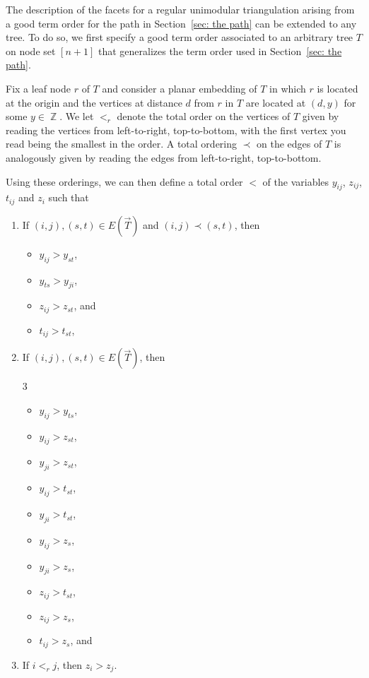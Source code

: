 \documentclass[11pt]{article}
\theoremstyle{definition}
\numberwithin{equation}{section}
\DeclareMathOperator{\ZZ}{\mathbb{Z}}
\begin{document}
The description of the facets for a regular unimodular triangulation arising from a good term order for the path in Section~\ref{sec: the path} can be extended to any tree.  
To do so, we first specify a good term order associated to an arbitrary tree $T$ on node set $[n+1]$ that generalizes the term order used in Section~\ref{sec: the path}.  

Fix a leaf node $r$ of $T$ and consider a planar embedding of $T$ in which $r$ is located at the origin and the vertices at distance $d$ from $r$ in $T$ are located at $(d, y)$ for some $y\in \ZZ$. 
We let $<_r$ denote the total order on the vertices of $T$ given by reading the vertices from left-to-right, top-to-bottom, with the first vertex you read being the smallest in the order. 
A total ordering $\prec$ on the edges of $T$ is analogously given by reading the edges from left-to-right, top-to-bottom. 

Using these orderings, we can then define a total order $<$ of the variables $y_{ij}$, $z_{ij}$, $t_{ij}$ and $z_i$ such that
\begin{enumerate}
    \item If $(i,j),(s,t)\in E(\overrightarrow{T})$ and $(i,j)\prec (s,t)$, then
    \begin{itemize}
        \item $y_{ij} > y_{st}$,
        \item $y_{ts} > y_{ji}$, 
        \item $z_{ij} > z_{st}$, and
        \item $t_{ij} > t_{st}$, 
    \end{itemize}
    \item If $(i,j), (s,t)\in E(\overrightarrow{T})$, then 
    \vspace{-12pt}
    \begin{multicols}{3}
    \begin{itemize}
        \item $y_{ij} > y_{ts}$,
        \item $y_{ij} > z_{st}$, 
        \item $y_{ji} > z_{st}$, 
        \item $y_{ij} > t_{st}$, 
        \item $y_{ji} > t_{st}$,
        \item $y_{ij} > z_s$, 
        \item $y_{ji} > z_s$, 
        \item $z_{ij} > t_{st}$, 
        \item $z_{ij} > z_s$,
        \item $t_{ij} > z_s$, and
    \end{itemize}
    \end{multicols}
    \vspace{-12pt}
    \item If $i <_r j$, then $z_i > z_j$. 
\end{enumerate}
\end{document}
